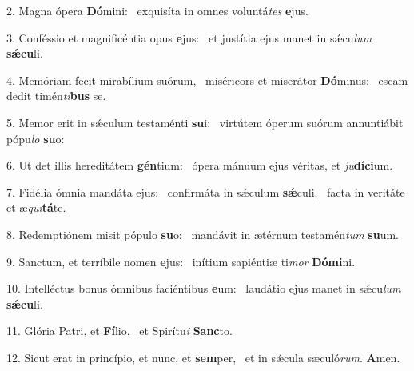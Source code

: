 2. Magna ópera \textbf{Dó}mini: \ast\  exquisíta in omnes voluntá\textit{tes} \textbf{e}jus.\

3. Conféssio et magnificéntia opus \textbf{e}jus: \ast\  et justítia ejus manet in sǽcu\textit{lum} \textbf{sǽ}\textbf{cu}li.\

4. Memóriam fecit mirabílium suórum, \dag\  miséricors et miserátor \textbf{Dó}minus: \ast\  escam dedit timén\textit{ti}\textbf{bus} se.\

5. Memor erit in sǽculum testaménti \textbf{su}i: \ast\  virtútem óperum suórum annuntiábit pópu\textit{lo} \textbf{su}o:\

6. Ut det illis hereditátem \textbf{gén}tium: \ast\  ópera mánuum ejus véritas, et \textit{ju}\textbf{dí}\textbf{ci}um.\

7. Fidélia ómnia mandáta ejus: \dag\  confirmáta in sǽculum \textbf{sǽ}culi, \ast\  facta in veritáte et æ\textit{qui}\textbf{tá}te.\

8. Redemptiónem misit pópulo \textbf{su}o: \ast\  mandávit in ætérnum testamén\textit{tum} \textbf{su}um.\

9. Sanctum, et terríbile nomen \textbf{e}jus: \ast\  inítium sapiéntiæ ti\textit{mor} \textbf{Dó}\textbf{mi}ni.\

10. Intelléctus bonus ómnibus faciéntibus \textbf{e}um: \ast\  laudátio ejus manet in sǽcu\textit{lum} \textbf{sǽ}\textbf{cu}li.\

11. Glória Patri, et \textbf{Fí}lio, \ast\  et Spirítu\textit{i} \textbf{Sanc}to.\

12. Sicut erat in princípio, et nunc, et \textbf{sem}per, \ast\  et in sǽcula sæculó\textit{rum}. \textbf{A}men.\

